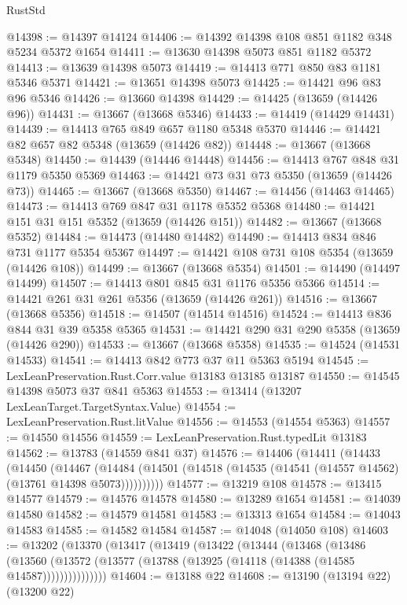 \begin{lexlean}{RustStd}
\begin{coremodule}
@14398 := @14397 @14124
@14406 := @14392 @14398 @108 @851 @1182 @348 @5234 @5372 @1654
@14411 := @13630 @14398 @5073 @851 @1182 @5372
@14413 := @13639 @14398 @5073
@14419 := @14413 @771 @850 @83 @1181 @5346 @5371
@14421 := @13651 @14398 @5073
@14425 := @14421 @96 @83 @96 @5346
@14426 := @13660 @14398
@14429 := @14425 (@13659 (@14426 @96))
@14431 := @13667 (@13668 @5346)
@14433 := @14419 (@14429 @14431)
@14439 := @14413 @765 @849 @657 @1180 @5348 @5370
@14446 := @14421 @82 @657 @82 @5348 (@13659 (@14426 @82))
@14448 := @13667 (@13668 @5348)
@14450 := @14439 (@14446 @14448)
@14456 := @14413 @767 @848 @31 @1179 @5350 @5369
@14463 := @14421 @73 @31 @73 @5350 (@13659 (@14426 @73))
@14465 := @13667 (@13668 @5350)
@14467 := @14456 (@14463 @14465)
@14473 := @14413 @769 @847 @31 @1178 @5352 @5368
@14480 := @14421 @151 @31 @151 @5352 (@13659 (@14426 @151))
@14482 := @13667 (@13668 @5352)
@14484 := @14473 (@14480 @14482)
@14490 := @14413 @834 @846 @731 @1177 @5354 @5367
@14497 := @14421 @108 @731 @108 @5354 (@13659 (@14426 @108))
@14499 := @13667 (@13668 @5354)
@14501 := @14490 (@14497 @14499)
@14507 := @14413 @801 @845 @31 @1176 @5356 @5366
@14514 := @14421 @261 @31 @261 @5356 (@13659 (@14426 @261))
@14516 := @13667 (@13668 @5356)
@14518 := @14507 (@14514 @14516)
@14524 := @14413 @836 @844 @31 @39 @5358 @5365
@14531 := @14421 @290 @31 @290 @5358 (@13659 (@14426 @290))
@14533 := @13667 (@13668 @5358)
@14535 := @14524 (@14531 @14533)
@14541 := @14413 @842 @773 @37 @11 @5363 @5194
@14545 := LexLeanPreservation.Rust.Corr.value @13183 @13185 @13187
@14550 := @14545 @14398 @5073 @37 @841 @5363
@14553 := @13414 (@13207 LexLeanTarget.TargetSyntax.Value)
@14554 := LexLeanPreservation.Rust.litValue
@14556 := @14553 (@14554 @5363)
@14557 := @14550 @14556
@14559 := LexLeanPreservation.Rust.typedLit @13183
@14562 := @13783 (@14559 @841 @37)
@14576 := @14406
    (@14411
      (@14433
        (@14450
          (@14467
            (@14484 (@14501 (@14518 (@14535 (@14541 (@14557 @14562) (@13761 @14398 @5073))))))))))
@14577 := @13219 @108
@14578 := @13415 @14577
@14579 := @14576 @14578
@14580 := @13289 @1654
@14581 := @14039 @14580
@14582 := @14579 @14581
@14583 := @13313 @1654
@14584 := @14043 @14583
@14585 := @14582 @14584
@14587 := @14048 (@14050 @108)
@14603 := @13202
    (@13370
      (@13417
        (@13419
          (@13422
            (@13444
              (@13468
                (@13486
                  (@13560
                    (@13572 (@13577 (@13788 (@13925 (@14118 (@14388 (@14585 @14587)))))))))))))))
@14604 := @13188 @22
@14608 := @13190 (@13194 @22) (@13200 @22)

\end{coremodule}
\end{lexlean}
